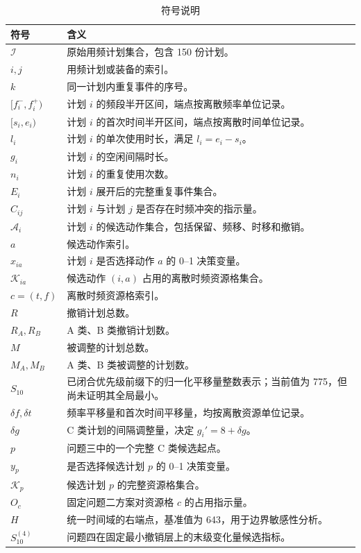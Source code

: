 \begin{table}[htbp]
\centering
\small
\renewcommand{\arraystretch}{0.92}
\caption{符号说明}
\label{tab:symbols}
\begin{tabularx}{0.94\textwidth}{>{\centering\arraybackslash}p{} X}
\toprule
符号 & 含义 \\
\midrule
\(\mathcal I\) & 原始用频计划集合，包含 150 份计划。\\
\(i,j\) & 用频计划或装备的索引。\\
\(k\) & 同一计划内重复事件的序号。\\
\([f_i^-,f_i^+)\) & 计划 \(i\) 的频段半开区间，端点按离散频率单位记录。\\
\([s_i,e_i)\) & 计划 \(i\) 的首次时间半开区间，端点按离散时间单位记录。\\
\(l_i\) & 计划 \(i\) 的单次使用时长，满足 \(l_i=e_i-s_i\)。\\
\(g_i\) & 计划 \(i\) 的空闲间隔时长。\\
\(n_i\) & 计划 \(i\) 的重复使用次数。\\
\(E_i\) & 计划 \(i\) 展开后的完整重复事件集合。\\
\(C_{ij}\) & 计划 \(i\) 与计划 \(j\) 是否存在时频冲突的指示量。\\
\(\mathcal A_i\) & 计划 \(i\) 的候选动作集合，包括保留、频移、时移和撤销。\\
\(a\) & 候选动作索引。\\
\(x_{ia}\) & 计划 \(i\) 是否选择动作 \(a\) 的 0--1 决策变量。\\
\(\mathcal K_{ia}\) & 候选动作 \((i,a)\) 占用的离散时频资源格集合。\\
\(c=(t,f)\) & 离散时频资源格索引。\\
\(R\) & 撤销计划总数。\\
\(R_A,R_B\) & A 类、B 类撤销计划数。\\
\(M\) & 被调整的计划总数。\\
\(M_A,M_B\) & A 类、B 类被调整的计划数。\\
\(S_{10}\) & 已闭合优先级前缀下的归一化平移量整数表示；当前值为 775，但尚未证明其全局最小。\\
\(\delta f,\delta t\) & 频率平移量和首次时间平移量，均按离散资源单位记录。\\
\(\delta g\) & C 类计划的间隔调整量，决定 \(g_i'=8+\delta g\)。\\
\(p\) & 问题三中的一个完整 C 类候选起点。\\
\(y_p\) & 是否选择候选计划 \(p\) 的 0--1 决策变量。\\
\(\mathcal K_p\) & 候选计划 \(p\) 的完整资源格集合。\\
\(O_c\) & 固定问题二方案对资源格 \(c\) 的占用指示量。\\
\(H\) & 统一时间域的右端点，基准值为 643，用于边界敏感性分析。\\
\(S_{10}^{(4)}\) & 问题四在固定最小撤销层上的末级变化量候选指标。\\
\bottomrule
\end{tabularx}
\end{table}
